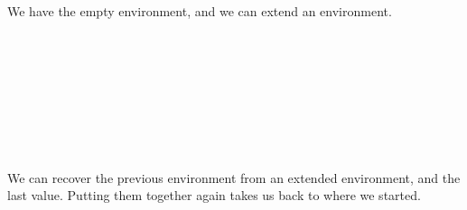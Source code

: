We have the empty environment, and we can extend an environment.

\begin{fence}
\begin{code}%
\>[0]\AgdaSpace{}%
\AgdaSymbol{:}\AgdaSpace{}%
\AgdaSpace{}%
\<%
\\
\>[0]\AgdaSpace{}%
\AgdaSymbol{()}\<%
\\
%
\\[\AgdaEmptyExtraSkip]%
\>[0]\AgdaSpace{}%
\AgdaSpace{}%
\<%
\\
%
\\[\AgdaEmptyExtraSkip]%
\>[0]\AgdaSpace{}%
\AgdaSymbol{:}\AgdaSpace{}%
\AgdaSpace{}%
\AgdaSymbol{\{}\AgdaSymbol{\}}\AgdaSpace{}%
\AgdaSpace{}%
\AgdaSpace{}%
\AgdaSpace{}%
\AgdaSpace{}%
\AgdaSpace{}%
\AgdaSpace{}%
\AgdaSpace{}%
\AgdaSymbol{(}\AgdaSpace{}%
\AgdaOperator{\AgdaInductiveConstructor{,}}\AgdaSpace{}%
\AgdaSymbol{)}\<%
\\
\>[0]\AgdaSymbol{(}\AgdaSpace{}%
\AgdaSpace{}%
\AgdaSymbol{)}\AgdaSpace{}%
\AgdaSpace{}%
\AgdaSymbol{=}\AgdaSpace{}%
\<%
\\
\>[0]\AgdaSymbol{(}\AgdaSpace{}%
\AgdaSpace{}%
\AgdaSymbol{)}\AgdaSpace{}%
\AgdaSymbol{(}\AgdaSpace{}%
\AgdaSymbol{)}\AgdaSpace{}%
\AgdaSymbol{=}\AgdaSpace{}%
\AgdaSpace{}%
\<%
\end{code}
\end{fence}

We can recover the previous environment from an extended environment,
and the last value. Putting them together again takes us back to where
we started.

